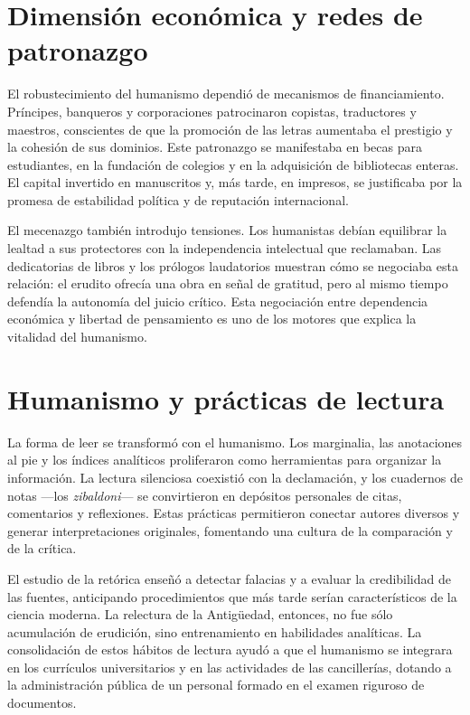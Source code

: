 \section{Dimensión económica y redes de patronazgo}
El robustecimiento del humanismo dependió de mecanismos de financiamiento. Príncipes, banqueros y corporaciones patrocinaron copistas, traductores y maestros, conscientes de que la promoción de las letras aumentaba el prestigio y la cohesión de sus dominios. Este patronazgo se manifestaba en becas para estudiantes, en la fundación de colegios y en la adquisición de bibliotecas enteras. El capital invertido en manuscritos y, más tarde, en impresos, se justificaba por la promesa de estabilidad política y de reputación internacional.

El mecenazgo también introdujo tensiones. Los humanistas debían equilibrar la lealtad a sus protectores con la independencia intelectual que reclamaban. Las dedicatorias de libros y los prólogos laudatorios muestran cómo se negociaba esta relación: el erudito ofrecía una obra en señal de gratitud, pero al mismo tiempo defendía la autonomía del juicio crítico. Esta negociación entre dependencia económica y libertad de pensamiento es uno de los motores que explica la vitalidad del humanismo.

\section{Humanismo y prácticas de lectura}
La forma de leer se transformó con el humanismo. Los marginalia, las anotaciones al pie y los índices analíticos proliferaron como herramientas para organizar la información. La lectura silenciosa coexistió con la declamación, y los cuadernos de notas —los \emph{zibaldoni}— se convirtieron en depósitos personales de citas, comentarios y reflexiones. Estas prácticas permitieron conectar autores diversos y generar interpretaciones originales, fomentando una cultura de la comparación y de la crítica.

El estudio de la retórica enseñó a detectar falacias y a evaluar la credibilidad de las fuentes, anticipando procedimientos que más tarde serían característicos de la ciencia moderna. La relectura de la Antigüedad, entonces, no fue sólo acumulación de erudición, sino entrenamiento en habilidades analíticas. La consolidación de estos hábitos de lectura ayudó a que el humanismo se integrara en los currículos universitarios y en las actividades de las cancillerías, dotando a la administración pública de un personal formado en el examen riguroso de documentos.

